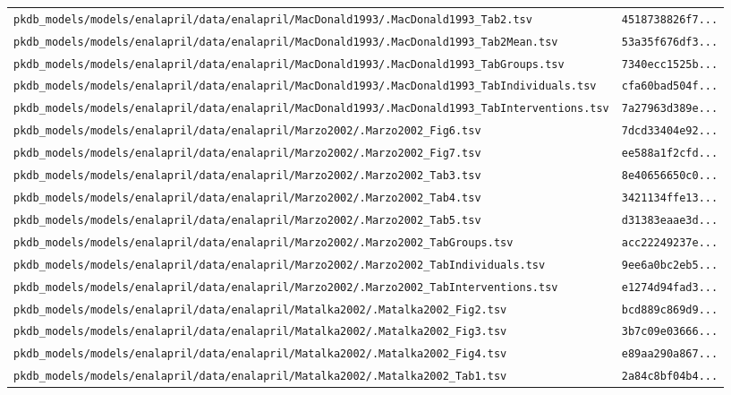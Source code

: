 \begin{longtable}{ll}
\texttt{pkdb\_models/models/enalapril/data/enalapril/MacDonald1993/.MacDonald1993\_Tab2.tsv} & \texttt{4518738826f7...} \\
\texttt{pkdb\_models/models/enalapril/data/enalapril/MacDonald1993/.MacDonald1993\_Tab2Mean.tsv} & \texttt{53a35f676df3...} \\
\texttt{pkdb\_models/models/enalapril/data/enalapril/MacDonald1993/.MacDonald1993\_TabGroups.tsv} & \texttt{7340ecc1525b...} \\
\texttt{pkdb\_models/models/enalapril/data/enalapril/MacDonald1993/.MacDonald1993\_TabIndividuals.tsv} & \texttt{cfa60bad504f...} \\
\texttt{pkdb\_models/models/enalapril/data/enalapril/MacDonald1993/.MacDonald1993\_TabInterventions.tsv} & \texttt{7a27963d389e...} \\
\texttt{pkdb\_models/models/enalapril/data/enalapril/Marzo2002/.Marzo2002\_Fig6.tsv} & \texttt{7dcd33404e92...} \\
\texttt{pkdb\_models/models/enalapril/data/enalapril/Marzo2002/.Marzo2002\_Fig7.tsv} & \texttt{ee588a1f2cfd...} \\
\texttt{pkdb\_models/models/enalapril/data/enalapril/Marzo2002/.Marzo2002\_Tab3.tsv} & \texttt{8e40656650c0...} \\
\texttt{pkdb\_models/models/enalapril/data/enalapril/Marzo2002/.Marzo2002\_Tab4.tsv} & \texttt{3421134ffe13...} \\
\texttt{pkdb\_models/models/enalapril/data/enalapril/Marzo2002/.Marzo2002\_Tab5.tsv} & \texttt{d31383eaae3d...} \\
\texttt{pkdb\_models/models/enalapril/data/enalapril/Marzo2002/.Marzo2002\_TabGroups.tsv} & \texttt{acc22249237e...} \\
\texttt{pkdb\_models/models/enalapril/data/enalapril/Marzo2002/.Marzo2002\_TabIndividuals.tsv} & \texttt{9ee6a0bc2eb5...} \\
\texttt{pkdb\_models/models/enalapril/data/enalapril/Marzo2002/.Marzo2002\_TabInterventions.tsv} & \texttt{e1274d94fad3...} \\
\texttt{pkdb\_models/models/enalapril/data/enalapril/Matalka2002/.Matalka2002\_Fig2.tsv} & \texttt{bcd889c869d9...} \\
\texttt{pkdb\_models/models/enalapril/data/enalapril/Matalka2002/.Matalka2002\_Fig3.tsv} & \texttt{3b7c09e03666...} \\
\texttt{pkdb\_models/models/enalapril/data/enalapril/Matalka2002/.Matalka2002\_Fig4.tsv} & \texttt{e89aa290a867...} \\
\texttt{pkdb\_models/models/enalapril/data/enalapril/Matalka2002/.Matalka2002\_Tab1.tsv} & \texttt{2a84c8bf04b4...} \\

\end{longtable}
